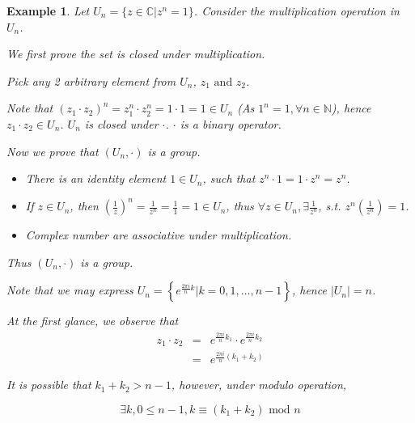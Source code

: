 \documentclass{article}
\theoremstyle{MyNonumberplain}
\theoremstyle{break}
\theoremstyle{break}
\newtheorem{example}{Example}[section]
\theoremstyle{break}
\theoremstyle{definition}
\theoremstyle{break}
\begin{document}
\begin{expbox}
    \begin{example}
        Let $U_n = \{ z \in \mathbb{C}|z^n = 1 \}$. Consider the multiplication operation in $U_n$.

        \begin{ansbox}
            We first prove the set is closed under multiplication. \bigskip

            Pick any 2 arbitrary element from $U_n$, $z_1 \text{ and } z_2$.\bigskip
    
            Note that $(z_1 \cdot z_2)^n = z_1^n \cdot z^n_2 = 1 \cdot 1 = 1 \in U_n$ (As
            $1^n = 1, \forall n \in \mathbb{N}$), hence $z_1 \cdot z_2 \in U_n$. $U_n$ is
            closed under $\cdot$. $\cdot$ is a binary operator.\bigskip
    
            Now we prove that $(U_n, \cdot)$ is a group.\bigskip
    
            \begin{itemize}
            \item There is an identity element $1 \in U_n$, such that $z^n \cdot 1 = 1
            \cdot z^n = z^n$.\bigskip
            
            \item If $z \in U_n$, then $\left( \frac{1}{z} \right)^n = \frac{1}{z^n} =
            \frac{1}{1} = 1 \in U_n$, thus $\forall z \in U_n, \exists \frac{1}{z^n}$,
            s.t. $z^n \left( \frac{1}{z^n} \right) = 1$.\bigskip
            
            \item Complex number are associative under multiplication.\bigskip
            \end{itemize}
            Thus $(U_n, \cdot)$ is a group.\bigskip
    
            Note that we may express $U_n = \left\{ e^{\frac{2 \pi i}{n} k} |k = 0, 1,
            \ldots, n - 1 \right\}$, hence $| U_n | = n$.\bigskip
    
            \hrulefill
    
            At the first glance, we observe that
            \begin{eqnarray*}
            z_1 \cdot z_2 & = & e^{\frac{2 \pi i}{n} k_1} \cdot e^{\frac{2 \pi i}{n}
            k_2}\\
            & = & e^{\frac{2 \pi i}{n} (k_1 + k_2)}
            \end{eqnarray*}
    
            It is possible that $k_1 + k_2 > n - 1$, however, under modulo operation,
    
            \[ \exists k, 0 \leq n - 1, k \equiv (k_1 + k_2) \text{ mod } n \]
    
        \end{ansbox}

    \end{example}
\end{expbox}
\end{document}
